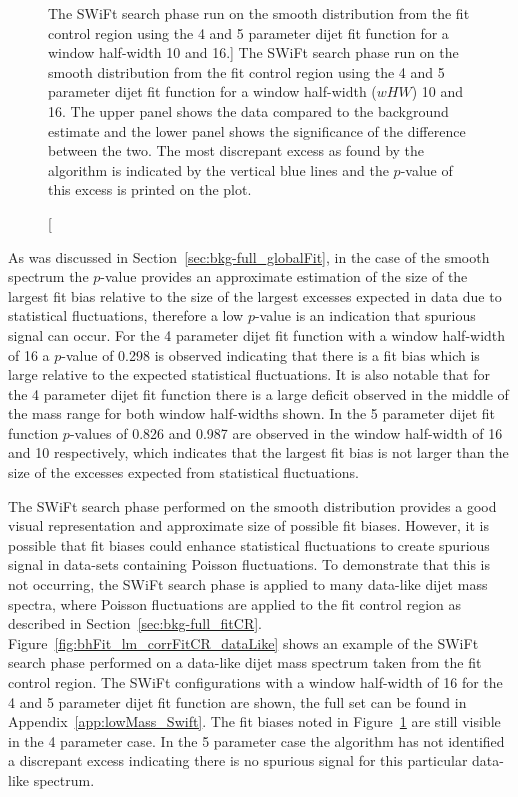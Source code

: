 \begin{figure}[!htb]
\caption
    [The SWiFt search phase run on the smooth distribution from the \lm{} fit control region
      using the 4 and 5 parameter dijet fit function for a window half-width 10 and 16.]
    {\label{fig:bhFit_lm_corrFitCR_smooth}
      The SWiFt search phase run on the smooth distribution from the \lm{} fit control region
      using the 4 and 5 parameter dijet fit function for a window half-width ($wHW$) 10 and 16.
      The upper panel shows the data compared to the background estimate and the lower panel shows the significance of the difference between the two.
      The most discrepant excess as found by the \bh{} algorithm is indicated by the vertical blue lines and the \mbox{$p$-value} of this excess is printed on the plot. }
\end{figure}

As was discussed in Section~\ref{sec:bkg-full_globalFit}, in the case of the smooth spectrum the \bh{} \mbox{$p$-value} provides an approximate estimation
of the size of the largest fit bias relative to the size of the largest excesses expected in data due to statistical fluctuations,
therefore a low $p$-value is an indication that spurious signal can occur. 
For the 4 parameter dijet fit function with a window half-width of 16 a \bh{} $p$-value of 0.298 is observed indicating that
there is a fit bias which is large relative to the expected statistical fluctuations.
It is also notable that for the 4 parameter dijet fit function there is a large deficit observed in the middle of the mass range for both window half-widths shown.
In the 5 parameter dijet fit function \bh{} $p$-values of 0.826 and 0.987 are observed in the window half-width of 16 and 10 respectively,
which indicates that the largest fit bias is not larger than the size of the excesses expected from statistical fluctuations.

The SWiFt search phase performed on the smooth distribution provides a good visual representation and approximate size of possible fit biases.
However, it is possible that fit biases could enhance statistical fluctuations to create spurious signal in data-sets containing Poisson fluctuations.
To demonstrate that this is not occurring, the SWiFt search phase is applied to many data-like dijet mass spectra,
where Poisson fluctuations are applied to the fit control region as described in Section~\ref{sec:bkg-full_fitCR}.
Figure~\ref{fig:bhFit_lm_corrFitCR_dataLike} shows an example of the SWiFt search phase performed on a data-like dijet mass spectrum taken from the fit control region.
The SWiFt configurations with a window half-width of 16 for the 4 and 5 parameter dijet fit function are shown, the full set can be found in Appendix~\ref{app:lowMass_Swift}.
The fit biases noted in Figure~\ref{fig:bhFit_lm_corrFitCR_smooth} are still visible in the 4 parameter case.
In the 5 parameter case the \bh{} algorithm has not identified a discrepant excess indicating
there is no spurious signal for this particular data-like spectrum.

